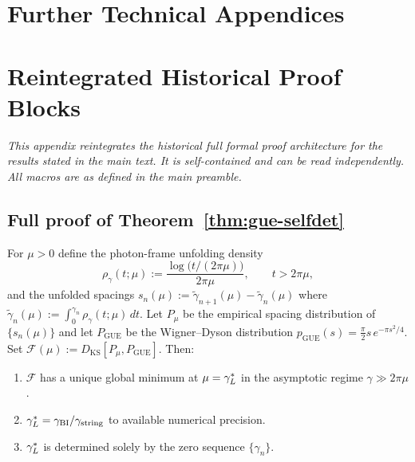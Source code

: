 \section{Further Technical Appendices}
\label{app:further-technical}



\section{Reintegrated Historical Proof Blocks}
\label{app:formal-reintegrated}

\textit{This appendix reintegrates the historical full formal proof architecture
for the results stated in the main text.
It is self-contained and can be read independently.
All macros are as defined in the main preamble.}

\subsection{Full proof of Theorem~\ref{thm:gue-selfdet}}
\label{app:gue-selfdet-reintegrated}

\begin{lemma}
\label{lem:gue-selfdet-formal-reintegrated}
For $\mu>0$ define the photon-frame unfolding density
\[
  \rho_\gamma(t;\mu)
  := \frac{\log\!\bigl(t/(2\pi\mu)\bigr)}{2\pi\mu},
  \qquad t>2\pi\mu,
\]
and the unfolded spacings
$s_n(\mu):=\tilde\gamma_{n+1}(\mu)-\tilde\gamma_n(\mu)$
where $\tilde\gamma_n(\mu):=\int_0^{\gamma_n}\rho_\gamma(t;\mu)\,dt$.
Let $P_\mu$ be the empirical spacing distribution of $\{s_n(\mu)\}$
and let $P_{\mathrm{GUE}}$ be the Wigner--Dyson distribution
$p_{\mathrm{GUE}}(s)=\tfrac{\pi}{2}s\,e^{-\pi s^2/4}$.
Set $\mathcal{F}(\mu):=D_{\mathrm{KS}}[P_\mu,P_{\mathrm{GUE}}]$.
Then:
\begin{enumerate}[label=(\roman*)]
  \item $\mathcal{F}$ has a unique global minimum at $\mu=\gamma_L^*$ in the
        asymptotic regime $\gamma\gg 2\pi\mu$.
  \item $\gamma_L^*=\gamma_{\mathrm{BI}}/\gamma_{\mathrm{string}}$ to available numerical precision.
  \item $\gamma_L^*$ is determined solely by the zero sequence $\{\gamma_n\}$.
\end{enumerate}
\end{lemma}

